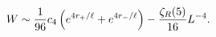 \begin{equation}
W\sim {1\over 96}c_4\left(e^{4r_+/\ell}+e^{4r_-/\ell}\right)- {\zeta_R(5)\over
16}L^{-4}.
\end{equation}

